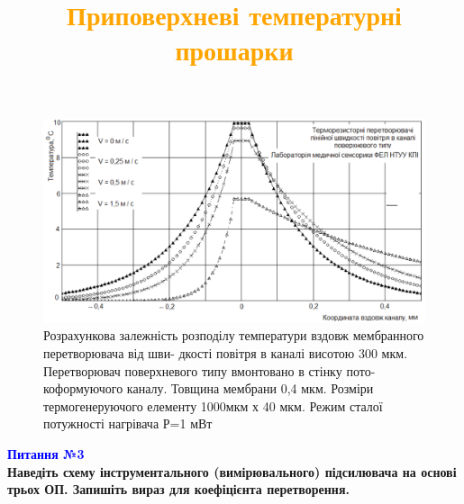 \documentclass[aspectratio=169]{beamer}
\begin{document}
{
\title{\textcolor{orange}{Приповерхневі температурні прошарки}}
\begin{frame}
\begin{figure}[h]
\begin{center}
 \includegraphics[scale=0.4]{g.png} 
\caption{Розрахункова залежність розподілу температури вздовж мембранного перетворювача від шви- дкості повітря в каналі висотою 300 мкм. Перетворювач поверхневого типу вмонтовано в стінку пото- коформуючого каналу. Товщина мембрани 0,4 мкм. Розміри термогенеруючого елементу 1000мкм х 40 мкм. Режим сталої потужності нагрівача Р=1 мВт}
\end{center}
\end{figure}
\end{frame}
 }



{

\begin{frame}
\large\textcolor{blue}{\textbf{Питання №3}}\\
\textbf {Наведіть схему інструментального (вимірювального) підсилювача на основі трьох ОП. Запишіть вираз для коефіцієнта перетворення.}
\end{frame}
}
\end{document}
